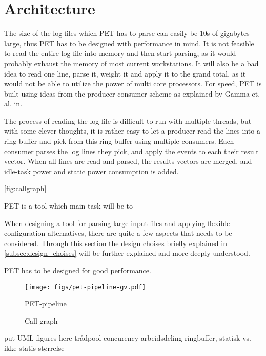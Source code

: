 \section{Architecture}

The size of the log files which PET has to parse can easily be 10s of gigabytes
large, thus PET has to be designed with performance in mind. It is not feasible
to read the entire log file into memory and then start parsing, as it would
probably exhaust the memory of most current workstations. It will also be a bad
idea to read one line, parse it, weight it and apply it to the grand total, as
it would not be able to utilize the power of multi core processors. For speed,
PET is built using ideas from the producer-consumer scheme as explained by Gamma
et. al. in\cite{designpatterns}.

The process of reading the log file is difficult to run with multiple threads, but
with some clever thoughts, it is rather easy to let a producer read the lines into a ring buffer
and pick from this ring buffer using multiple consumers. Each consumer parses the log lines
they pick, and apply the events to each their result vector. When all lines are read and parsed,
the results vectors are merged, and idle-task power and static power consumption is added.

\autoref{fig:callgraph}


PET is a tool which main task will be to 

When designing a tool for parsing large input files and applying flexible configuration alternatives,
there are quite a few aspects that needs to be considered. Through this section the design choises
briefly explained in \autoref{subsec:design_choises} will be further explained and more deeply understood.

PET has to be designed for good performance.


\begin{figure}
    \texttt{[image: figs/pet-pipeline-gv.pdf]}
    \caption{PET-pipeline}
    \label{fig:pipeline}
\end{figure}

\begin{figure}
    {\tiny }
    \caption{Call graph}
    \label{fig:callgraph}
\end{figure}

put UML-figures here
trådpool
concurency
arbeidsdeling
ringbuffer, statisk vs. ikke statis størrelse




